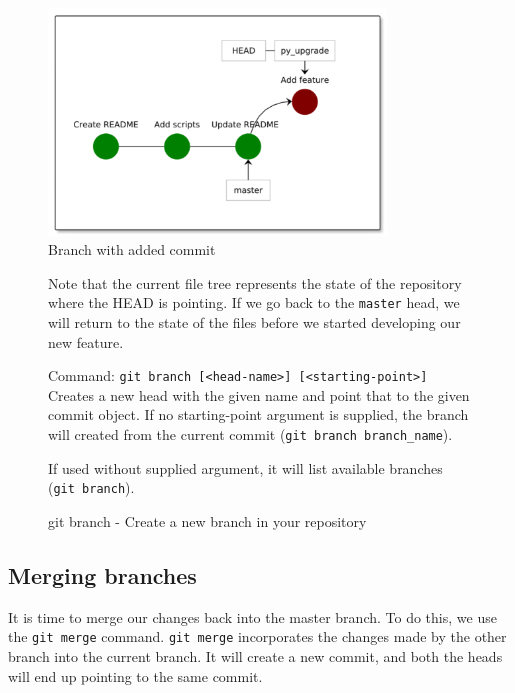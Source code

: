\documentclass[../main/git_course_main.tex]{subfiles}
\begin{document}
\begin{figure}[h!]
	\centering
	\includegraphics[width=0.8\textwidth]{../visualizations/chapter4/43_branch_with_commit.pdf}
	\caption{Branch with added commit}
	\label{fig:branch_commit}
\end{figure}

\begin{figure}[h!]
\begin{redbox}
Note that the current file tree represents the state of the repository where the HEAD is pointing. If we go back to the \verb$master$ head, we will return to the state of the files before we started developing our new feature.
\end{redbox}
\end{figure}

\begin{figure}[h!]
\begin{bluebox}
Command: \verb$git branch [<head-name>] [<starting-point>]$ \\

Creates a new head with the given name and point that to the given commit object.
If no starting-point argument is supplied, the branch will created from the current commit (\verb$git branch branch_name$).

If used without supplied argument, it will list available branches (\verb$git branch$).
\end{bluebox}
\label{command:branch}
\caption{git branch - Create a new branch in your repository}
\end{figure}

\subsection{Merging branches}

It is time to merge our changes back into the master branch.
To do this, we use the \verb$git merge$ command. \verb$git merge$ incorporates the changes made by the other branch into the current branch.
It will create a new commit, and both the heads will end up pointing to the same commit.
\end{document}
